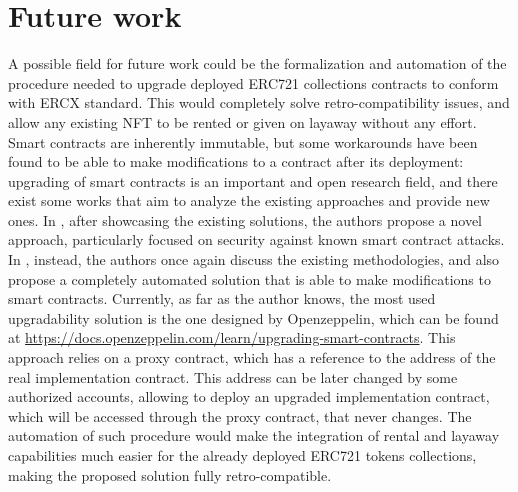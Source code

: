 \documentclass[english, LaM, oneside]{sapthesis}%
\begin{document}
 \section{Future work}
 A possible field for future work could be the formalization and automation of the procedure needed to upgrade deployed ERC721 collections contracts to conform with ERCX standard. This would completely solve retro-compatibility issues, and allow any existing NFT to be rented or given on layaway without any effort. \newline
 Smart contracts are inherently immutable, but some workarounds have been found to be able to make modifications to a contract after its deployment: upgrading of smart contracts is an important and open research field, and there exist some works that aim to analyze the existing approaches and provide new ones.\newline
 In \cite{ref:SCupgrade1}, after showcasing the existing solutions, the authors propose a novel approach, particularly focused on security against known smart contract attacks. In \cite{ref:SCupgrade2}, instead, the authors once again discuss the existing methodologies, and also propose a completely automated solution that is able to make modifications to smart contracts. \newline
 Currently, as far as the author knows, the most used upgradability solution is the one designed by Openzeppelin, which can be found at \url{https://docs.openzeppelin.com/learn/upgrading-smart-contracts}. This approach relies on a proxy contract, which has a reference to the address of the real implementation contract. This address can be later changed by some authorized accounts, allowing to deploy an upgraded implementation contract, which will be accessed through the proxy contract, that never changes.\newline
 The automation of such procedure would make the integration of rental and layaway capabilities much easier for the already deployed ERC721 tokens collections, making the proposed solution fully retro-compatible.
\end{document}

